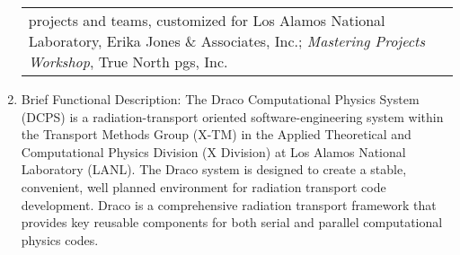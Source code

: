 \begin{enumerate}
\begin{center}
\begin{tabular}{l|p{3in}}
{              projects and teams, customized for Los Alamos National
              Laboratory}, Erika Jones \& Associates, Inc.; 
              {\em Mastering Projects Workshop}, True North pgs, Inc.
\end{tabular}
\end{center}
\item Brief Functional Description: The Draco Computational Physics
System (DCPS) is a radiation-transport oriented software-engineering
system within the Transport Methods Group (X-TM) in the Applied
Theoretical and Computational Physics Division (X Division) at Los
Alamos National Laboratory (LANL). The Draco system is designed to
create a stable, convenient, well planned environment for radiation
transport code development. Draco is a comprehensive radiation
transport framework that provides key reusable components for both
serial and parallel computational physics codes.
\end{enumerate}
